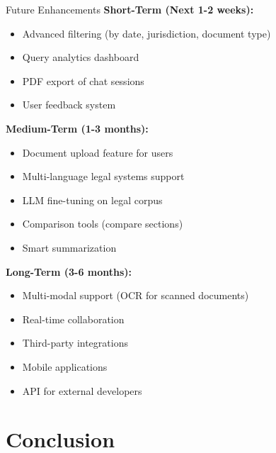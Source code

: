 \documentclass[11pt,aspectratio=16:9]{beamer}
\begin{document}
\begin{frame}{Future Enhancements}
    \textbf{Short-Term (Next 1-2 weeks):}
    \begin{itemize}
        \item Advanced filtering (by date, jurisdiction, document type)
        \item Query analytics dashboard
        \item PDF export of chat sessions
        \item User feedback system
    \end{itemize}
    
    \vspace{0.4cm}
    
    \textbf{Medium-Term (1-3 months):}
    \begin{itemize}
        \item Document upload feature for users
        \item Multi-language legal systems support
        \item LLM fine-tuning on legal corpus
        \item Comparison tools (compare sections)
        \item Smart summarization
    \end{itemize}
    
    \vspace{0.4cm}
    
    \textbf{Long-Term (3-6 months):}
    \begin{itemize}
        \item Multi-modal support (OCR for scanned documents)
        \item Real-time collaboration
        \item Third-party integrations
        \item Mobile applications
        \item API for external developers
    \end{itemize}
\end{frame}

\section*{Conclusion}
\end{document}
